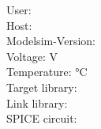 User: \envuser \\
Host: \envhostname \\
Modelsim-Version: \spicedcversion\\
Voltage: \envvdd\si{\volt} \\
Temperature: \envtemperature\si{\celsius}\\
Target library: \envsimtargetlibrary\\
Link library: \envsimlinklibrary \\
SPICE circuit: \envspicecir